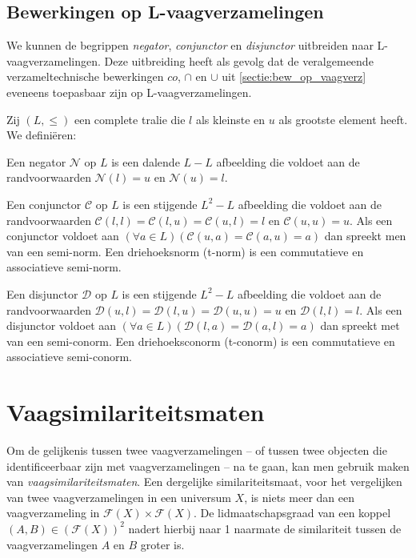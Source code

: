 \subsection{Bewerkingen op L-vaagverzamelingen}

We kunnen de begrippen \emph{negator}, \emph{conjunctor} en 
\emph{disjunctor} uitbreiden naar L-vaag\-ver\-za\-me\-ling\-en. Deze uitbreiding heeft als gevolg 
dat de veralgemeende verzameltechnische bewerkingen $co$, $\cap$ en 
$\cup$ uit \ref{sectie:bew_op_vaagverz} eveneens toepasbaar zijn op L-vaagverzamelingen.

Zij $(L,\le)$ een complete tralie die $l$ als kleinste en $u$ als grootste element heeft. We
defini\"eren:
\begin{definitie}
Een negator $\mathcal{N}$ op $L$ is een dalende $L - L$ afbeelding die voldoet
aan de randvoorwaarden $\mathcal{N}(l)=u$ en $\mathcal{N}(u)=l$. 
\end{definitie}
\begin{definitie}
Een conjunctor $\mathcal{C}$ op $L$ is een stijgende $L^2 - L$ afbeelding die voldoet aan de
randvoorwaarden $\mathcal{C}(l,l)=\mathcal{C}(l,u)=\mathcal{C}(u,l)=l$ en $\mathcal{C}(u,u)=u$. 
Als een conjunctor voldoet aan 
$(\forall a \in L)(\mathcal{C}(u,a)=\mathcal{C}(a,u)=a)$ dan spreekt men van een semi-norm.
Een driehoeksnorm (t-norm) is een commutatieve en associatieve semi-norm.
\end{definitie}
\begin{definitie}
Een disjunctor $\mathcal{D}$ op $L$ is een stijgende $L^2 - L$ afbeelding die voldoet
aan de randvoorwaarden $\mathcal{D}(u,l)=\mathcal{D}(l,u)=\mathcal{D}(u,u)=u$ en 
$\mathcal{D}(l,l)=l$. Als een disjunctor voldoet aan 
$(\forall a \in L)(\mathcal{D}(l,a)=\mathcal{D}(a,l)=a)$ dan spreekt met van een semi-conorm.
Een driehoeksconorm (t-conorm) is een commutatieve en associatieve semi-conorm.
\end{definitie}

\section{Vaagsimilariteitsmaten}
\label{sectie:vaagsimilariteitsmaten}

Om de gelijkenis tussen twee vaagverzamelingen -- of tussen twee objecten die identificeerbaar 
zijn met vaagverzamelingen -- na te gaan, kan men gebruik maken van \emph{vaagsimilariteitsmaten}. 
Een dergelijke similariteitsmaat, voor het vergelijken van twee vaagverzamelingen in een 
universum $X$, is niets meer dan een vaagverzameling in $\mathcal{F}(X) \times \mathcal{F}(X)$. De 
lidmaatschapsgraad van een koppel $(A,B) \in (\mathcal{F}(X))^2$ nadert hierbij naar 1 naarmate 
de similariteit tussen de vaagverzamelingen $A$ en $B$ groter is.

